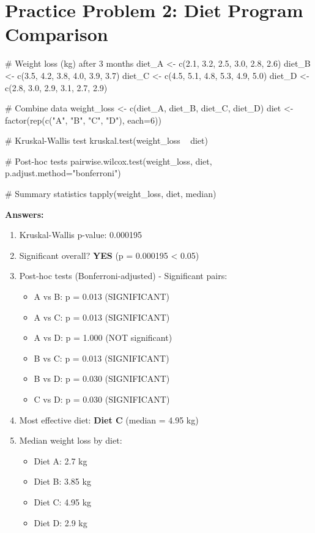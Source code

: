 \documentclass[11pt]{article}
\begin{document}
\section{Practice Problem 2: Diet Program Comparison}

\begin{rcode}
# Weight loss (kg) after 3 months
diet_A <- c(2.1, 3.2, 2.5, 3.0, 2.8, 2.6)
diet_B <- c(3.5, 4.2, 3.8, 4.0, 3.9, 3.7)
diet_C <- c(4.5, 5.1, 4.8, 5.3, 4.9, 5.0)
diet_D <- c(2.8, 3.0, 2.9, 3.1, 2.7, 2.9)

# Combine data
weight_loss <- c(diet_A, diet_B, diet_C, diet_D)
diet <- factor(rep(c("A", "B", "C", "D"), each=6))

# Kruskal-Wallis test
kruskal.test(weight_loss ~ diet)

# Post-hoc tests
pairwise.wilcox.test(weight_loss, diet, p.adjust.method="bonferroni")

# Summary statistics
tapply(weight_loss, diet, median)
\end{rcode}

\textbf{Answers:}
\begin{enumerate}
\item \textcolor{answergreen}{Kruskal-Wallis p-value: 0.000195}

\item \textcolor{answergreen}{Significant overall? \textbf{YES} (p = 0.000195 < 0.05)}

\item \textcolor{answergreen}{Post-hoc tests (Bonferroni-adjusted) - Significant pairs:}
\begin{itemize}
\item \textcolor{answergreen}{A vs B: p = 0.013 (SIGNIFICANT)}
\item \textcolor{answergreen}{A vs C: p = 0.013 (SIGNIFICANT)}
\item \textcolor{answergreen}{A vs D: p = 1.000 (NOT significant)}
\item \textcolor{answergreen}{B vs C: p = 0.013 (SIGNIFICANT)}
\item \textcolor{answergreen}{B vs D: p = 0.030 (SIGNIFICANT)}
\item \textcolor{answergreen}{C vs D: p = 0.030 (SIGNIFICANT)}
\end{itemize}

\item \textcolor{answergreen}{Most effective diet: \textbf{Diet C} (median = 4.95 kg)}

\item \textcolor{answergreen}{Median weight loss by diet:}
\begin{itemize}
\item \textcolor{answergreen}{Diet A: 2.7 kg}
\item \textcolor{answergreen}{Diet B: 3.85 kg}
\item \textcolor{answergreen}{Diet C: 4.95 kg}
\item \textcolor{answergreen}{Diet D: 2.9 kg}
\end{itemize}
\end{enumerate}
\end{document}
